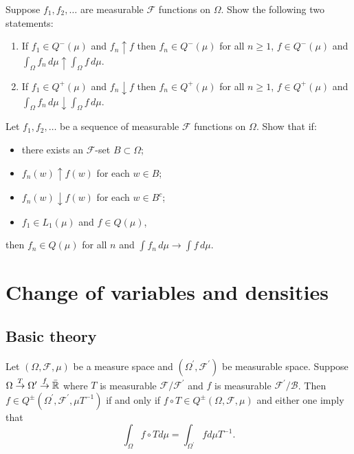 \begin{exercise}
Suppose $f_1, f_2, \ldots$ are measurable $\mathcal F$ functions on $\Omega$.
Show the following two statements:
\begin{enumerate}
\item If $f_1\in Q^-(\mu)$ and $f_n\uparrow f$ then $f_n\in Q^-(\mu)$ for all $n\geq 1$, $f\in Q^-(\mu)$ and $\int_\Omega f_n \,d\mu \uparrow \int_\Omega f \, d\mu$.
\item If $f_1\in Q^+(\mu)$ and $f_n\downarrow f$ then $f_n\in Q^+(\mu)$ for all $n\geq 1$, $f\in Q^+(\mu)$ and $\int_\Omega f_n \,d\mu \downarrow \int_\Omega f \, d\mu$.
\end{enumerate}
\end{exercise}

\begin{exercise}
Let $f_1, f_2, \ldots$ be a sequence of measurable $\mathcal F$ functions on $\Omega$. Show that if:
\begin{itemize}
\item there exists an $\mathcal F$-set $B\subset \Omega$;
\item $f_n(w)\uparrow f(w)$ for each $w\in B$;
\item $f_n(w)\downarrow f(w)$ for each $w\in B^c$;
\item $f_1\in L_1(\mu)$ and $f\in Q(\mu)$,
\end{itemize}
then $f_n\in Q(\mu)$ for all $n$ and $\int f_n \,d\mu \rightarrow \int f \,d\mu$.
\end{exercise}



\clearpage
\section{Change of variables and densities}

\subsection{Basic theory}

\begin{theorem}
\label{thm: change of variables}
Let $(\Omega, \mathcal F,\mu)$ be a measure space and $(\Omega^\prime, \mathcal F^\prime)$ be measurable space.
Suppose \mbox{$\Omega \overset T \rightarrow \Omega^\prime \overset f \rightarrow \bar{\Bbb R}$} where $
T$ is measurable $\mathcal F/\mathcal F^\prime$ and $f$ is measurable $\mathcal F^\prime/\mathcal B$. Then \mbox{$f\in Q^\pm(\Omega^\prime, \mathcal F^\prime, \mu T^{-1})$} if and only if \mbox{$f\circ T\in Q^\pm(\Omega, \mathcal F, \mu)$} and either one imply that
\[  \int_\Omega f\circ T d\mu = \int_{\Omega^\prime} f d\mu T^{-1}. \]
\end{theorem}

